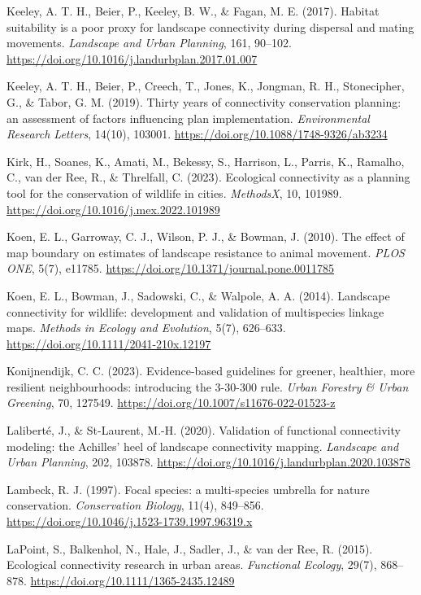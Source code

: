 \documentclass[a4paper,11pt]{report}
\begin{document}
Keeley, A. T. H., Beier, P., Keeley, B. W., \& Fagan, M. E. (2017). Habitat suitability is a poor proxy for landscape connectivity during dispersal and mating movements. \textit{Landscape and Urban Planning}, 161, 90--102. \url{https://doi.org/10.1016/j.landurbplan.2017.01.007}

Keeley, A. T. H., Beier, P., Creech, T., Jones, K., Jongman, R. H., Stonecipher, G., \& Tabor, G. M. (2019). Thirty years of connectivity conservation planning: an assessment of factors influencing plan implementation. \textit{Environmental Research Letters}, 14(10), 103001. \url{https://doi.org/10.1088/1748-9326/ab3234}

Kirk, H., Soanes, K., Amati, M., Bekessy, S., Harrison, L., Parris, K., Ramalho, C., van der Ree, R., \& Threlfall, C. (2023). Ecological connectivity as a planning tool for the conservation of wildlife in cities. \textit{MethodsX}, 10, 101989. \url{https://doi.org/10.1016/j.mex.2022.101989}

Koen, E. L., Garroway, C. J., Wilson, P. J., \& Bowman, J. (2010). The effect of map boundary on estimates of landscape resistance to animal movement. \textit{PLOS ONE}, 5(7), e11785. \url{https://doi.org/10.1371/journal.pone.0011785}

Koen, E. L., Bowman, J., Sadowski, C., \& Walpole, A. A. (2014). Landscape connectivity for wildlife: development and validation of multispecies linkage maps. \textit{Methods in Ecology and Evolution}, 5(7), 626--633. \url{https://doi.org/10.1111/2041-210x.12197}

Konijnendijk, C. C. (2023). Evidence-based guidelines for greener, healthier, more resilient neighbourhoods: introducing the 3-30-300 rule. \textit{Urban Forestry \& Urban Greening}, 70, 127549. \url{https://doi.org/10.1007/s11676-022-01523-z}

Laliberté, J., \& St-Laurent, M.-H. (2020). Validation of functional connectivity modeling: the Achilles' heel of landscape connectivity mapping. \textit{Landscape and Urban Planning}, 202, 103878. \url{https://doi.org/10.1016/j.landurbplan.2020.103878}

Lambeck, R. J. (1997). Focal species: a multi-species umbrella for nature conservation. \textit{Conservation Biology}, 11(4), 849--856. \url{https://doi.org/10.1046/j.1523-1739.1997.96319.x}

LaPoint, S., Balkenhol, N., Hale, J., Sadler, J., \& van der Ree, R. (2015). Ecological connectivity research in urban areas. \textit{Functional Ecology}, 29(7), 868--878. \url{https://doi.org/10.1111/1365-2435.12489}
\end{document}
